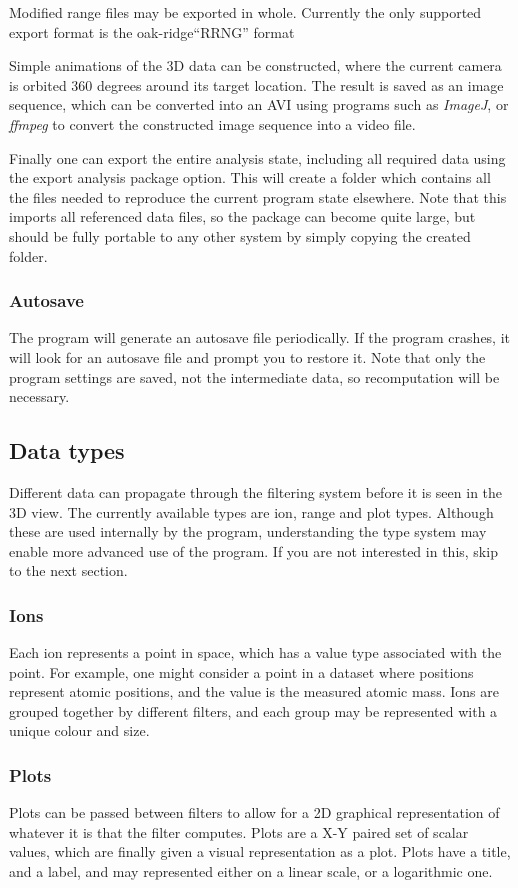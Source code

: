 \documentclass[10pt]{article}
\begin{document}
Modified range files may be exported in whole. Currently the only supported export format is the oak-ridge``RRNG'' format

Simple animations of the 3D data can be constructed, where the current camera is orbited 360 degrees around its target location. The result is saved as an image sequence, which can be converted into an AVI using programs such as \emph{ImageJ}, or \emph{ffmpeg} to convert the constructed image sequence into a video file.

Finally one can export the entire analysis state, including all required data using the export analysis package option. This will create  a folder which contains all the files needed to reproduce the current program state elsewhere. Note that this imports all referenced data files, so the package can become quite large, but should be fully portable to any other system by simply copying the created folder.

\subsubsection{Autosave}
The program will generate an autosave file periodically. If the program crashes, it will look for an autosave file and prompt you to restore it. Note that only the program settings are saved, not the intermediate data, so recomputation will be necessary.  

\subsection{Data types}
Different data can propagate through the filtering system before it is seen in the 3D view. The currently available types are ion, range and plot types. Although these are used internally by the program, understanding the type system may enable more advanced use of the program. If you are not interested in this, skip to the next section.  

\subsubsection{Ions}
Each ion represents a point in space, which has a value type associated with the point. For example, one might consider a point in a dataset where positions represent atomic positions, and the value is the measured atomic mass. Ions are grouped together by different filters, and each group may be represented with a unique colour and size.  

\subsubsection{Plots}
Plots can be passed between filters to allow for a 2D graphical representation of whatever it is that the filter computes. Plots are a X-Y paired set of scalar values, which are finally given a visual representation as a plot. Plots have a title, and a label, and may represented either on a linear scale, or a logarithmic one.
\end{document}
